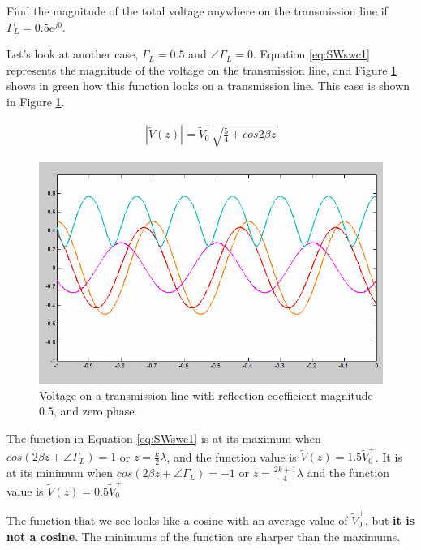 \documentclass{ximera}
\begin{document}
\begin{example}

Find the magnitude of the total voltage anywhere on the transmission line if $\Gamma_L=0.5 e^{j0}$.

\begin{explanation}
\item Let's look at another case,  $\Gamma_L=0.5$ and $\angle \Gamma_L=0$. Equation \ref{eq:SWswc1}  represents the magnitude of the voltage on the transmission line, and Figure \ref{fig:SWreflcoeffvid} shows in green how this function looks on a transmission line. This case is shown in Figure \ref{fig:SWreflcoeffvid}. 

\begin{eqnarray}
|\tilde{V}(z)|=\tilde{V}_0^+ \sqrt{\frac{5}{4}+ cos{2 \beta z} }\label{eq:SWswc1}
\end{eqnarray}

\begin{figure}[htbp]
\begin{center}
\includegraphics[scale=0.3]{../jpg/specialcase.jpg}
\end{center}
\caption{Voltage on a transmission line with reflection coefficient magnitude 0.5, and zero phase.}
\label{fig:SWreflcoeffvid}
\end{figure}



The function in Equation \ref{eq:SWswc1} is at its maximum 
when $cos(2 \beta z+\angle \Gamma_L)=1$ or $z=\frac{k}{2} \lambda$, and the function
value is $\tilde{V}(z)=1.5\tilde{V}_0^+  $. It is at its
minimum when  $cos(2 \beta z+ \angle \Gamma_L)=-1$ or $z=\frac{2 k +1}{4} \lambda$
and the function value is $\tilde{V}(z)=0.5 \tilde{V}_0^+$

The function that we see looks
like a cosine with an average value of $ \tilde{V}_0^+ $, but {\bf it is not a cosine}.
The minimums of the function are sharper than the maximums. 



\end{explanation}
\end{example}
\end{document}
